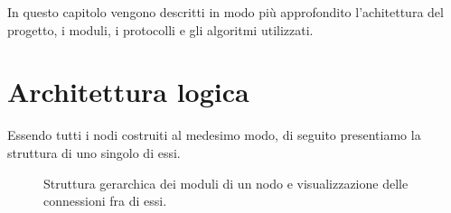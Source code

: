 \documentclass[italian]{memoir}
\begin{document}
In questo capitolo vengono descritti in modo più approfondito l'achitettura del
	   progetto, i moduli, i protocolli e gli algoritmi utilizzati.

\section{Architettura logica}

Essendo tutti i nodi costruiti al medesimo modo, di seguito presentiamo la struttura
	   di uno singolo di essi. 

\begin{figure}[H]
\caption{Struttura gerarchica dei moduli di un nodo e visualizzazione delle connessioni
	   fra di essi.}
\label{img:struttura_nodo}
\end{figure}
\end{document}
